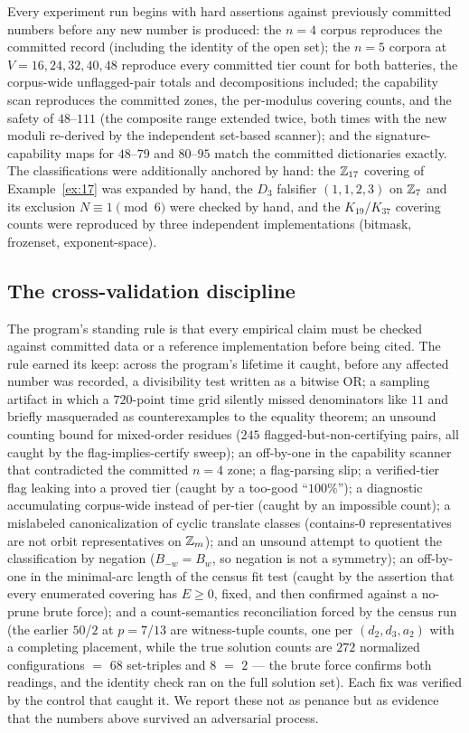 Every experiment run begins with hard assertions against previously
committed numbers before any new number is produced: the $n=4$ corpus
reproduces the committed record (including the identity of the open
set); the $n=5$ corpora at $V=16,24,32,40,48$ reproduce every committed
tier count for both batteries, the corpus-wide unflagged-pair totals and
decompositions included; the capability scan reproduces the committed
zones, the per-modulus covering counts, and the safety of $48$--$111$ (the
composite range extended twice, both times with the new moduli re-derived
by the independent set-based scanner); and the signature-capability maps
for $48$--$79$ and $80$--$95$ match the committed dictionaries exactly. The classifications were additionally anchored by hand: the
$\mathbb{Z}_{17}$ covering of Example~\ref{ex:17} was expanded by hand, the
$D_3$ falsifier $(1,1,2,3)$ on $\mathbb{Z}_7$ and its exclusion
$N\equiv1\pmod6$ were checked by hand, and the $K_{19}$/$K_{37}$
covering counts were reproduced by three independent implementations
(bitmask, frozenset, exponent-space).

\subsection{The cross-validation discipline}

The program's standing rule is that every empirical claim must be checked
against committed data or a reference implementation before being cited.
The rule earned its keep: across the program's lifetime it caught, before
any affected number was recorded, a divisibility test written as a
bitwise OR; a sampling artifact in which a $720$-point time grid silently
missed denominators like $11$ and briefly masqueraded as counterexamples
to the equality theorem; an unsound counting bound for mixed-order
residues ($245$ flagged-but-non-certifying pairs, all caught by the
flag-implies-certify sweep); an off-by-one in the capability scanner that
contradicted the committed $n=4$ zone; a flag-parsing slip; a
verified-tier flag leaking into a proved tier (caught by a too-good
``$100\%$''); a diagnostic accumulating corpus-wide instead of
per-tier (caught by an impossible count); a mislabeled canonicalization
of cyclic translate classes (contains-$0$ representatives are not orbit
representatives on $\mathbb{Z}_m$); and an unsound attempt to quotient the
classification by negation ($B_{-w}=B_w$, so negation is not a symmetry);
an off-by-one in the minimal-arc length of the census fit test (caught by
the assertion that every enumerated covering has $E\ge0$, fixed, and then
confirmed against a no-prune brute force); and a count-semantics
reconciliation forced by the census run (the earlier $50$/$2$ at
$p=7$/$13$ are witness-tuple counts, one per $(d_2,d_3,a_2)$ with a
completing placement, while the true solution counts are $272$
normalized configurations $=$ $68$ set-triples and $8$ $=$ $2$ --- the
brute force confirms both readings, and the identity check ran on the full
solution set).
Each fix was verified by the control that caught it. We report these not
as penance but as evidence that the numbers above survived an adversarial
process.

